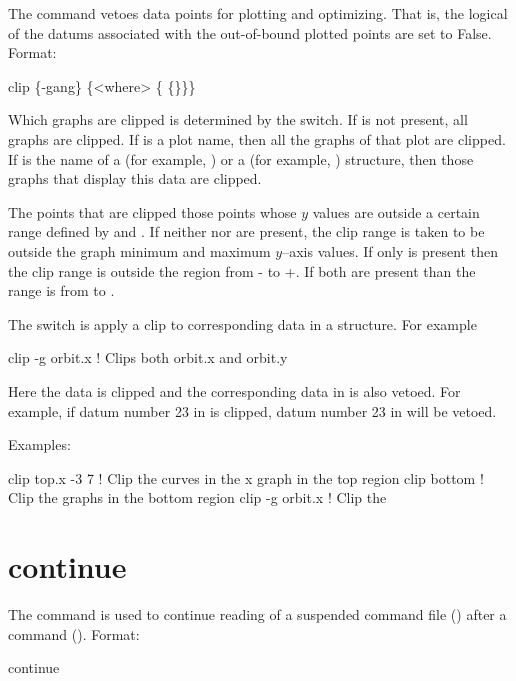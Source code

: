 The  command vetoes data points for plotting and
optimizing. That is, the  logical of the datums
associated with the out-of-bound plotted points are set to False.
Format:
\begin{example}
  clip \{-gang\} \{<where> \{<limit1> \{<limit2>\}\}\}
\end{example}

\vskip 0.2in 

Which graphs are clipped is determined by the  switch. If
 is not present, all graphs are clipped. If  is a
plot name, then all the graphs of that plot are clipped. If 
is the name of a  (for example, ) or a
 (for example, ) structure, then those graphs
that display this data are clipped.

The points that are clipped those points whose $y$ values are outside
a certain range defined by  and . If neither
 nor  are present, the clip range is taken
to be outside the graph minimum and maximum $y$--axis values. If only
 is present then the clip range is outside the region
from - to +. If both are present than the
range is from  to .

The  switch is apply a clip to corresponding data in a 
structure. For example
\begin{example}
  clip -g orbit.x   ! Clips both orbit.x and orbit.y 
\end{example}
Here the  data is clipped and the corresponding data in
 is also vetoed. For example, if datum number 23 in
 is clipped, datum number 23 in  will be
vetoed.

Examples:
\begin{example}
  clip top.x -3  7  ! Clip the curves in the x graph in the top region
  clip bottom       ! Clip the graphs in the bottom region
  clip -g orbit.x   ! Clip the 
\end{example}

\section{continue}
\label{s:continue}

The  command is used to continue reading of a suspended
command file () after a  command
(). Format:
\begin{example}
  continue
\end{example}


